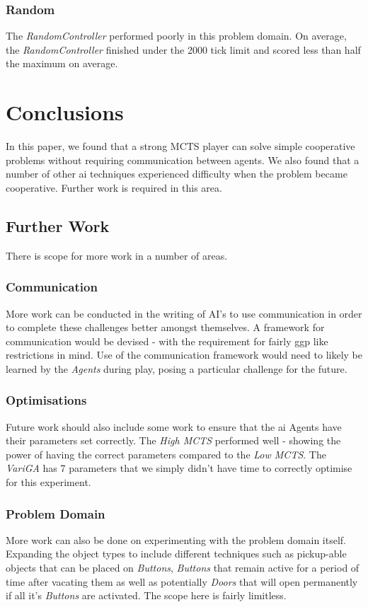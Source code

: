 \documentclass{IEEEtran}
\begin{document}
\subsubsection{Random}
The \emph{RandomController} performed poorly in this problem domain. On average, the \emph{RandomController} finished under the 2000 tick limit and scored less than half the maximum on average.
\section{Conclusions}
In this paper, we found that a strong MCTS player can solve simple cooperative problems without requiring communication between agents. We also found that a number of other \gls{ai} techniques experienced difficulty when the problem became cooperative. Further work is required in this area.

\subsection{Further Work}
There is scope for more work in a number of areas.

\subsubsection{Communication}
More work can be conducted in the writing of AI's to use communication in order to complete these challenges better amongst themselves. A framework for communication would be devised - with the requirement for fairly \gls{ggp} like restrictions in mind. Use of the communication framework would need to likely be learned by the \emph{Agents} during play, posing a particular challenge for the future.

\subsubsection{Optimisations}
Future work should also include some work to ensure that the \gls{ai} Agents have their parameters set correctly. The \emph{High MCTS} performed well - showing the power of having the correct parameters compared to the \emph{Low MCTS}. The \emph{VariGA} has 7 parameters that we simply didn't have time to correctly optimise for this experiment.

\subsubsection{Problem Domain}
More work can also be done on experimenting with the problem domain itself. Expanding the object types to include different techniques such as pickup-able objects that can be placed on \emph{Buttons}, \emph{Buttons} that remain active for a period of time after vacating them as well as potentially \emph{Doors} that will open permanently if all it's \emph{Buttons} are activated. The scope here is fairly limitless.



\end{document}
